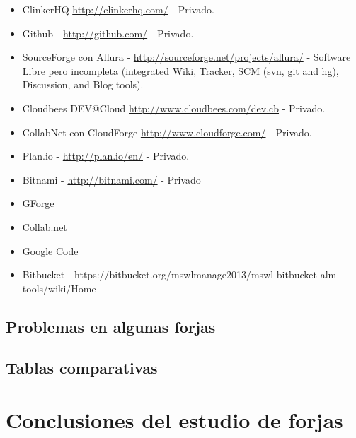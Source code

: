 \begin{itemize}
	\item ClinkerHQ \url{http://clinkerhq.com/} - Privado.
	\item Github - \url{http://github.com/} - Privado.
	\item SourceForge con Allura - \url{http://sourceforge.net/projects/allura/} - Software Libre pero incompleta (integrated Wiki, Tracker, SCM (svn, git and hg), Discussion, and Blog tools).
	\item Cloudbees DEV@Cloud \url{http://www.cloudbees.com/dev.cb} - Privado.
	\item CollabNet con CloudForge \url{http://www.cloudforge.com/} - Privado.
	\item Plan.io - \url{http://plan.io/en/} - Privado.
	\item Bitnami - \url{http://bitnami.com/} - Privado
	\item GForge
	\item Collab.net
	\item Google Code
	\item Bitbucket - https://bitbucket.org/mswlmanage2013/mswl-bitbucket-alm-tools/wiki/Home
\end{itemize}


\subsection{Problemas en algunas forjas}
\label{sub:problemas}


\subsection{Tablas comparativas}
\label{sub:comparativa}


\section{Conclusiones del estudio de forjas}
\label{sec:conclusiones}

